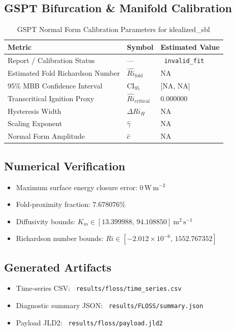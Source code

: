 \subsection{GSPT Bifurcation \& Manifold Calibration}
\begin{table}[htbp]
\centering
\caption{GSPT Normal Form Calibration Parameters for idealized\_sbl}
\label{tab:gspt_calibration_floss_floss_80x2m_9h_report}
\begin{tabular}{lll}
\hline
{\bfseries Metric} & {\bfseries Symbol} & {\bfseries Estimated Value} \\
\hline
Report / Calibration Status & --- & \texttt{ invalid\_fit } \\
Estimated Fold Richardson Number & $\hat{Ri}_{\mathrm{fold}}$ & NA \\
95\% MBB Confidence Interval & CI$_{95}$ & [NA, NA] \\
Transcritical Ignition Proxy & $\hat{Ri}_{\mathrm{critical}}$ & 0.000000 \\
Hysteresis Width & $\Delta Ri_H$ & NA \\
Scaling Exponent & $\hat{\gamma}$ & NA \\
Normal Form Amplitude & $\hat{c}$ & NA \\
\hline
\end{tabular}
\end{table}

\subsection{Numerical Verification}
\begin{itemize}
  \item Maximum surface energy closure error:
  $0\,\mathrm{W\,m^{-2}}$
  \item Fold-proximity fraction:
  $7.678076\%$
  \item Diffusivity bounds:
  $K_m \in [13.399988,\,94.108850]~\mathrm{m^2\,s^{-1}}$
  \item Richardson number bounds:
  $Ri \in [-2.012 \times 10^{-6},\,1552.767352]$
\end{itemize}

\subsection{Generated Artifacts}
\begin{itemize}
  \item Time-series CSV: \texttt{ results/floss/time\_series.csv }
  \item Diagnostic summary JSON: \texttt{ results/FLOSS/summary.json }
  \item Payload JLD2: \texttt{ results/floss/payload.jld2 }
\end{itemize}

